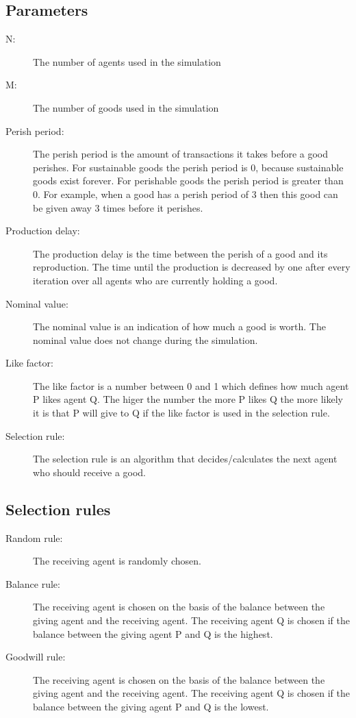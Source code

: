 \documentclass{article}
\begin{document}
\subsection{Parameters}
\begin{description}
  \item[N:] The number of agents used in the simulation
  \item[M:] The number of goods used in the simulation
  \item[Perish period:] The perish period is the amount of transactions it takes before a good perishes. For sustainable goods the perish period is 0, because sustainable goods exist forever. For perishable goods the perish period is greater than 0. For example, when a good has a perish period of 3 then this good can be given away 3 times before it perishes.
  \item[Production delay:] The production delay is the time between the perish of a good and its reproduction. The time until the production is decreased by one after every iteration over all agents who are currently holding a good.
  \item[Nominal value:] The nominal value is an indication of how much a good is worth. The nominal value does not change during the simulation.
  \item[Like factor:] The like factor is a number between 0 and 1 which defines how much agent P likes agent Q. The higer the number the more P likes Q the more likely it is that P will give to Q if the like factor is used in the selection rule.
  \item[Selection rule:] The selection rule is an algorithm that decides/calculates the next agent who should receive a good.

\end{description}


\subsection{Selection rules}
\begin{description}
  \item[Random rule:] The receiving agent is randomly chosen.
  \item[Balance rule:] The receiving agent is chosen on the basis of the balance between the giving agent and the receiving agent. The receiving agent Q is chosen if the balance between the giving agent P and Q is the highest.
  \item[Goodwill rule:] The receiving agent is chosen on the basis of the balance between the giving agent and the receiving agent. The receiving agent Q is chosen if the balance between the giving agent P and Q is the lowest.
\end{description}
\end{document}
